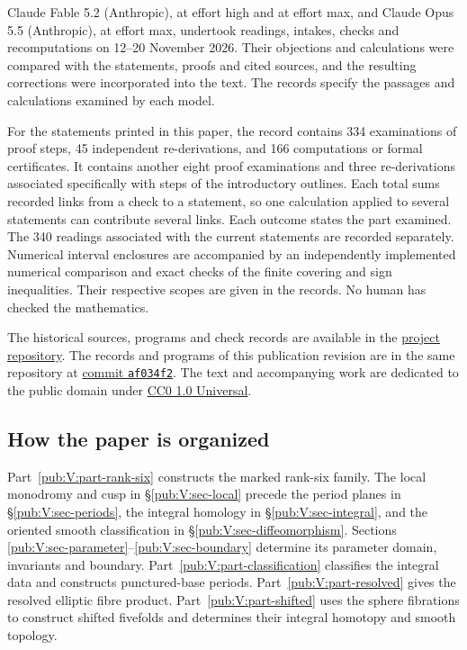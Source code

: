 \documentclass[11pt,a4paper]{article}
\numberwithin{equation}{section}
\theoremstyle{definition}
\newcommand{\SsixRepositoryCommit}{83d76022bcd442278b760db9ff438afceed6c6ea}
\begin{document}
Claude Fable 5.2 (Anthropic), at effort high and at effort max, and
Claude Opus 5.5 (Anthropic), at effort max, undertook readings, intakes,
checks and recomputations on 12--20 November 2026. Their objections
and calculations were compared with the statements, proofs and cited
sources, and the resulting corrections were incorporated into the text.
The records specify the passages and calculations examined by each model.

For the statements printed in this paper, the record contains
334 examinations of proof steps, 45 independent re-derivations, and
166 computations or formal certificates. It contains another eight
proof examinations and three re-derivations associated specifically
with steps of the introductory outlines. Each total sums recorded
links from a check to a statement, so one calculation applied to several
statements can contribute several links. Each outcome states the part
examined. The 340 readings associated with the current statements are
recorded separately. Numerical interval enclosures are accompanied by
an independently implemented numerical comparison and exact checks of
the finite covering and sign inequalities. Their respective scopes are
given in the records. No human has checked the mathematics.

The historical sources, programs and check records are available in the
\href{https://github.com/KokunoYumeto/s6-complex-structure-workbench/tree/\SsixRepositoryCommit/pro_returns/S6_SERIES_GRIND_checkpoint_10_20261120T0211Z/}{project repository}.
The records and programs of this publication revision are in the same
repository at
\href{https://github.com/KokunoYumeto/s6-complex-structure-workbench/tree/af034f283649c6d4b0c6869bfe1e1fcd50346e85/pro_returns/S6_SERIES_PUBLISH_checkpoint_04_20261121T0142Z/}{commit \texttt{af034f2}}.
The text and accompanying work are dedicated to the public domain under
\href{https://creativecommons.org/publicdomain/zero/1.0/}{CC0 1.0 Universal}.

\subsection{How the paper is organized}
Part~\ref{pub:V:part-rank-six} constructs the marked rank-six family.
The local monodromy and cusp in \S\ref{pub:V:sec-local} precede the
period planes in \S\ref{pub:V:sec-periods}, the integral homology in
\S\ref{pub:V:sec-integral}, and the oriented smooth classification
in \S\ref{pub:V:sec-diffeomorphism}. Sections
\ref{pub:V:sec-parameter}--\ref{pub:V:sec-boundary} determine its
parameter domain, invariants and boundary.
Part~\ref{pub:V:part-classification} classifies the integral data and
constructs punctured-base periods. Part~\ref{pub:V:part-resolved}
gives the resolved elliptic fibre product. Part~\ref{pub:V:part-shifted}
uses the sphere fibrations to construct shifted fivefolds and determines
their integral homotopy and smooth topology.
\end{document}
